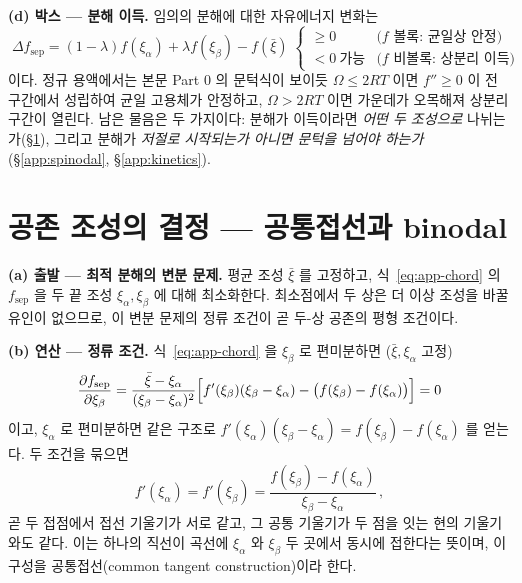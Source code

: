 \documentclass[11pt,a4paper]{article}
\begin{document}
\textbf{(d) 박스 --- 분해 이득.} 임의의 분해에 대한 자유에너지 변화는
\begin{equation}
\boxed{\;\Delta f_\mathrm{sep}=(1-\lambda)f(\xi_\alpha)+\lambda f(\xi_\beta)-f(\bar\xi)
\;\begin{cases}\ge0 &\text{($f$ 볼록: 균일상 안정)}\\[2pt]
<0\ \text{가능} &\text{($f$ 비볼록: 상분리 이득)}\end{cases}}
\label{eq:app-gain}
\end{equation}
이다. 정규 용액에서는 본문 Part 0 의 문턱식이 보이듯 $\Omega\le2RT$ 이면 $f''\ge0$ 이 전 구간에서
성립하여 균일 고용체가 안정하고, $\Omega>2RT$ 이면 가운데가 오목해져 상분리 구간이 열린다. 남은
물음은 두 가지이다: 분해가 이득이라면 \emph{어떤 두 조성으로} 나뉘는가(\S\ref{app:binodal}), 그리고
분해가 \emph{저절로 시작되는가 아니면 문턱을 넘어야 하는가}(\S\ref{app:spinodal},
\S\ref{app:kinetics}).

\section{공존 조성의 결정 --- 공통접선과 binodal}\label{app:binodal}

\textbf{(a) 출발 --- 최적 분해의 변분 문제.} 평균 조성 $\bar\xi$ 를 고정하고, 식~\eqref{eq:app-chord}
의 $f_\mathrm{sep}$ 을 두 끝 조성 $\xi_\alpha,\xi_\beta$ 에 대해 최소화한다. 최소점에서 두 상은 더
이상 조성을 바꿀 유인이 없으므로, 이 변분 문제의 정류 조건이 곧 두-상 공존의 평형 조건이다.

\textbf{(b) 연산 --- 정류 조건.} 식~\eqref{eq:app-chord} 을 $\xi_\beta$ 로 편미분하면
($\bar\xi,\xi_\alpha$ 고정)
\begin{equation}
\frac{\partial f_\mathrm{sep}}{\partial\xi_\beta}
=\frac{\bar\xi-\xi_\alpha}{(\xi_\beta-\xi_\alpha)^2}
\Bigl[f'(\xi_\beta)(\xi_\beta-\xi_\alpha)-\bigl(f(\xi_\beta)-f(\xi_\alpha)\bigr)\Bigr]=0
\label{eq:app-statA}
\end{equation}
이고, $\xi_\alpha$ 로 편미분하면 같은 구조로
$f'(\xi_\alpha)(\xi_\beta-\xi_\alpha)=f(\xi_\beta)-f(\xi_\alpha)$ 를 얻는다. 두 조건을 묶으면
\begin{equation}
f'(\xi_\alpha)=f'(\xi_\beta)=\frac{f(\xi_\beta)-f(\xi_\alpha)}{\xi_\beta-\xi_\alpha}\,,
\label{eq:app-ct}
\end{equation}
곧 두 접점에서 접선 기울기가 서로 같고, 그 공통 기울기가 두 점을 잇는 현의 기울기와도 같다. 이는
하나의 직선이 곡선에 $\xi_\alpha$ 와 $\xi_\beta$ 두 곳에서 동시에 접한다는 뜻이며, 이 구성을
공통접선(common tangent construction)이라 한다.
\end{document}
